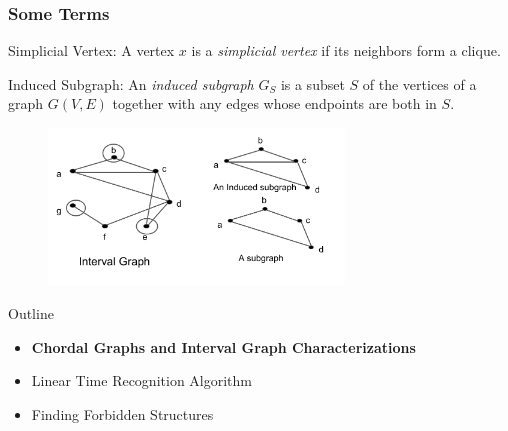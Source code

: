 \documentclass{beamer}
\begin{document}
\begin{frame}
	\frametitle{Some Terms}
	Simplicial Vertex: A vertex $x$ is a \emph{simplicial vertex} if its neighbors form a clique.
	    
	\vspace{0.1in}
	
	Induced Subgraph: An \emph{induced subgraph} $G_S$ is a subset $S$ of the vertices of a graph $G(V,E)$ together with any edges whose endpoints are both in $S$.
	
	
	\begin{figure}
		\includegraphics[width = 0.7\textwidth]{figures/simplicial_induced.pdf}
	\end{figure}

\end{frame}

\begin{frame}{Outline}
\begin{itemize}
    \item \textbf{Chordal Graphs and Interval Graph Characterizations}
    \vspace{0.2in}
    \item Linear Time Recognition Algorithm
    \vspace{0.2in}
    \item Finding Forbidden Structures
\end{itemize}
\end{frame}
\end{document}

